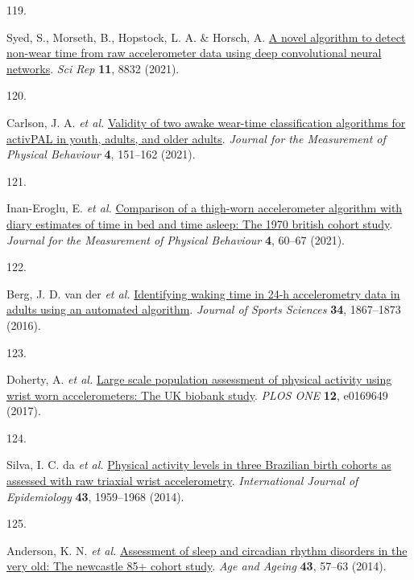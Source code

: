 \documentclass[
  10pt,
]{scrbook}
\newlength{\cslhangindent}
\newlength{\csllabelwidth}
\newlength{\cslentryspacingunit} %
\newenvironment{CSLReferences}[2] %
 {%
  \setlength{\parindent}{0pt}
  \ifodd #1
  \let\oldpar\par
  \def\par{\hangindent=\cslhangindent\oldpar}
  \fi
  \setlength{\parskip}{#2\cslentryspacingunit}
 }%
 {}
\newcommand{\CSLLeftMargin}[1]{\parbox[t]{\csllabelwidth}{#1}}
\newcommand{\CSLRightInline}[1]{\parbox[t]{\linewidth - \csllabelwidth}{#1}\break}
\let\originaltextbf\textbf
\renewcommand{\textbf}[1]{\textcolor{color1}{\textsf{\originaltextbf{#1}}}}
\begin{document}
\begin{CSLReferences}{0}{0}
\leavevmode{}%
\CSLLeftMargin{119. }%
\CSLRightInline{Syed, S., Morseth, B., Hopstock, L. A. \& Horsch, A.
\href{https://doi.org/10.1038/s41598-021-87757-z}{A novel algorithm to
detect non-wear time from raw accelerometer data using deep
convolutional neural networks}. \emph{Sci Rep} \textbf{11}, 8832
(2021).}

\leavevmode{}%
\CSLLeftMargin{120. }%
\CSLRightInline{Carlson, J. A. \emph{et al.}
\href{https://doi.org/10.1123/jmpb.2020-0045}{Validity of two awake
wear-time classification algorithms for {activPAL} in youth, adults, and
older adults}. \emph{Journal for the Measurement of Physical Behaviour}
\textbf{4}, 151--162 (2021).}

\leavevmode{}%
\CSLLeftMargin{121. }%
\CSLRightInline{Inan-Eroglu, E. \emph{et al.}
\href{https://doi.org/10.1123/jmpb.2020-0033}{Comparison of a thigh-worn
accelerometer algorithm with diary estimates of time in bed and time
asleep: The 1970 british cohort study}. \emph{Journal for the
Measurement of Physical Behaviour} \textbf{4}, 60--67 (2021).}

\leavevmode{}%
\CSLLeftMargin{122. }%
\CSLRightInline{Berg, J. D. van der \emph{et al.}
\href{https://doi.org/10.1080/02640414.2016.1140908}{Identifying waking
time in 24-h accelerometry data in adults using an automated algorithm}.
\emph{Journal of Sports Sciences} \textbf{34}, 1867--1873 (2016).}

\leavevmode{}%
\CSLLeftMargin{123. }%
\CSLRightInline{Doherty, A. \emph{et al.}
\href{https://doi.org/10.1371/journal.pone.0169649}{Large scale
population assessment of physical activity using wrist worn
accelerometers: The {UK} biobank study}. \emph{{PLOS} {ONE}}
\textbf{12}, e0169649 (2017).}

\leavevmode{}%
\CSLLeftMargin{124. }%
\CSLRightInline{Silva, I. C. da \emph{et al.}
\href{https://doi.org/10.1093/ije/dyu203}{Physical activity levels in
three Brazilian birth cohorts as assessed with raw triaxial wrist
accelerometry}. \emph{International Journal of Epidemiology}
\textbf{43}, 1959--1968 (2014).}

\leavevmode{}%
\CSLLeftMargin{125. }%
\CSLRightInline{Anderson, K. N. \emph{et al.}
\href{https://doi.org/10.1093/ageing/aft153}{Assessment of sleep and
circadian rhythm disorders in the very old: The newcastle 85+ cohort
study}. \emph{Age and Ageing} \textbf{43}, 57--63 (2014).}


\end{CSLReferences}
\end{document}
